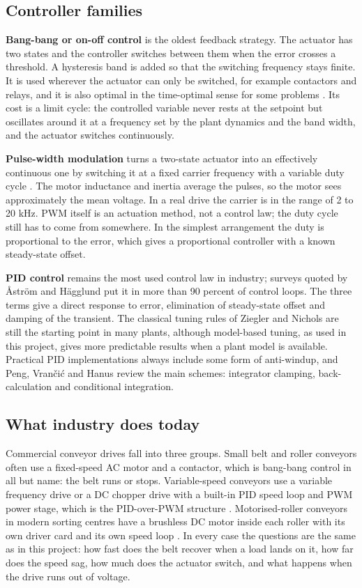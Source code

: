 \documentclass[12pt,a4paper]{article}
\begin{document}
\subsection{Controller families}

\textbf{Bang-bang or on-off control} is the oldest feedback strategy. The actuator has two states and the controller switches between them when the error crosses a threshold. A hysteresis band is added so that the switching frequency stays finite. It is used wherever the actuator can only be switched, for example contactors and relays, and it is also optimal in the time-optimal sense for some problems \cite{astrom-murray}. Its cost is a limit cycle: the controlled variable never rests at the setpoint but oscillates around it at a frequency set by the plant dynamics and the band width, and the actuator switches continuously.

\textbf{Pulse-width modulation} turns a two-state actuator into an effectively continuous one by switching it at a fixed carrier frequency with a variable duty cycle \cite{mohan}. The motor inductance and inertia average the pulses, so the motor sees approximately the mean voltage. In a real drive the carrier is in the range of 2 to 20 kHz. PWM itself is an actuation method, not a control law; the duty cycle still has to come from somewhere. In the simplest arrangement the duty is proportional to the error, which gives a proportional controller with a known steady-state offset.

\textbf{PID control} remains the most used control law in industry; surveys quoted by Åström and Hägglund \cite{astrom-hagglund} put it in more than 90 percent of control loops. The three terms give a direct response to error, elimination of steady-state offset and damping of the transient. The classical tuning rules of Ziegler and Nichols \cite{ziegler} are still the starting point in many plants, although model-based tuning, as used in this project, gives more predictable results when a plant model is available. Practical PID implementations always include some form of anti-windup, and Peng, Vrančić and Hanus \cite{peng} review the main schemes: integrator clamping, back-calculation and conditional integration.

\subsection{What industry does today}

Commercial conveyor drives fall into three groups. Small belt and roller conveyors often use a fixed-speed AC motor and a contactor, which is bang-bang control in all but name: the belt runs or stops. Variable-speed conveyors use a variable frequency drive or a DC chopper drive with a built-in PID speed loop and PWM power stage, which is the PID-over-PWM structure \cite{hughes, leonhard}. Motorised-roller conveyors in modern sorting centres have a brushless DC motor inside each roller with its own driver card and its own speed loop \cite{cema}. In every case the questions are the same as in this project: how fast does the belt recover when a load lands on it, how far does the speed sag, how much does the actuator switch, and what happens when the drive runs out of voltage.
\end{document}
